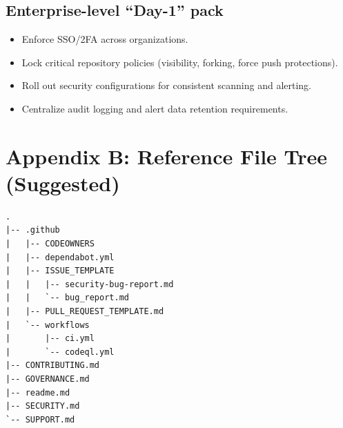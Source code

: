 \documentclass[11pt]{article}
\begin{document}
\subsection{Enterprise-level ``Day-1'' pack}
\begin{checklistbox}[title={Enterprise Baseline}]
\begin{itemize}[leftmargin=*,itemsep=2pt]
  \item Enforce SSO/2FA across organizations.
  \item Lock critical repository policies (visibility, forking, force push protections).
  \item Roll out security configurations for consistent scanning and alerting.
  \item Centralize audit logging and alert data retention requirements.
\end{itemize}
\end{checklistbox}

\section{Appendix B: Reference File Tree (Suggested)}

\begin{examplebox}[title={Example repository structure for community health + security configs}]
\begin{verbatim}
.
|-- .github
|   |-- CODEOWNERS
|   |-- dependabot.yml
|   |-- ISSUE_TEMPLATE
|   |   |-- security-bug-report.md
|   |   `-- bug_report.md
|   |-- PULL_REQUEST_TEMPLATE.md
|   `-- workflows
|       |-- ci.yml
|       `-- codeql.yml
|-- CONTRIBUTING.md
|-- GOVERNANCE.md
|-- readme.md
|-- SECURITY.md
`-- SUPPORT.md
\end{verbatim}
\end{examplebox}
\end{document}
